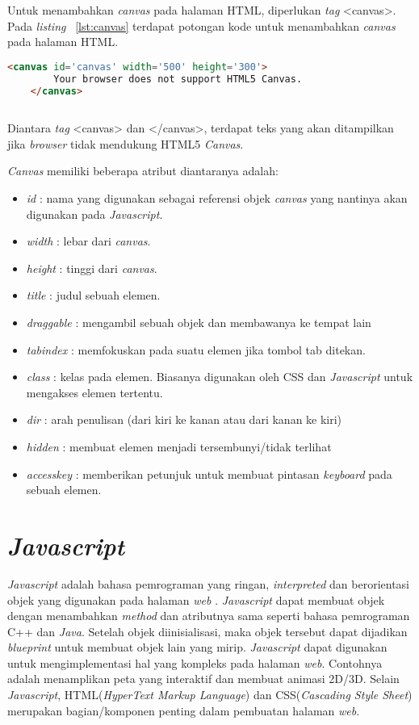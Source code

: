 Untuk menambahkan \textit{canvas} pada halaman HTML, diperlukan \textit{tag} <canvas>. Pada \textit{listing} ~\ref{lst:canvas} terdapat potongan kode untuk menambahkan \textit{canvas} pada halaman HTML. 

\begin{lstlisting}[language=HTML, caption=Menambahkan \textit{canvas}, label={lst:canvas}]
	<canvas id='canvas' width='500' height='300'>
		Your browser does not support HTML5 Canvas.
	</canvas>
	
\end{lstlisting}

Diantara \textit{tag} <canvas> dan </canvas>, terdapat teks yang akan ditampilkan jika \textit{browser} tidak mendukung HTML5 \textit{Canvas}. 

\textit{Canvas} memiliki beberapa atribut diantaranya adalah: 
\begin{itemize}
	\item \textit{id} : nama yang digunakan sebagai referensi objek \textit{canvas} yang nantinya akan digunakan pada \textit{Javascript}.
	\item \textit{width} : lebar dari \textit{canvas}.
	\item \textit{height} : tinggi dari \textit{canvas}.
	\item \textit{title} : judul sebuah elemen.
	\item \textit{draggable} : mengambil sebuah objek dan membawanya ke tempat lain
	\item \textit{tabindex} : memfokuskan pada suatu elemen jika tombol tab ditekan.
	\item \textit{class} : kelas pada elemen. Biasanya digunakan oleh CSS dan \textit{Javascript} untuk mengakses elemen tertentu.
	\item \textit{dir} : arah penulisan (dari kiri ke kanan atau dari kanan ke kiri)
	\item \textit{hidden} : membuat elemen menjadi tersembunyi/tidak terlihat
	\item \textit{accesskey} : memberikan petunjuk untuk membuat pintasan \textit{keyboard} pada sebuah elemen.
\end{itemize}


\section{\textit{Javascript}}
\label{sec:Javascript}
\textit{Javascript} adalah bahasa pemrograman yang ringan, \textit{interpreted} dan berorientasi objek yang digunakan pada halaman \textit{web} \cite{MDN:05:Web}. \textit{Javascript} dapat membuat objek dengan menambahkan \textit{method} dan atributnya sama seperti bahasa pemrograman C++ dan \textit{Java}. Setelah objek diinisialisasi, maka objek tersebut dapat dijadikan \textit{blueprint} untuk membuat objek lain yang mirip. \textit{Javascript} dapat digunakan untuk mengimplementasi hal yang kompleks pada halaman \textit{web}. Contohnya adalah menamplikan peta yang interaktif dan membuat animasi 2D/3D. Selain \textit{Javascript}, HTML(\textit{HyperText Markup Language}) dan CSS(\textit{Cascading Style Sheet}) merupakan bagian/komponen penting dalam pembuatan halaman \textit{web}.\\

